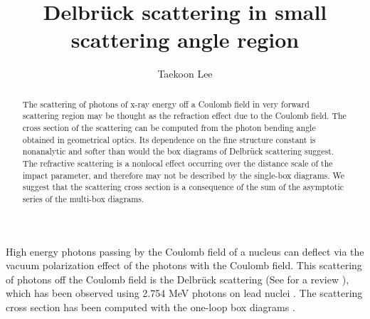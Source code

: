 \documentclass[aps,tightenlines,preprint]{revtex4-1}
\begin{document}
\title{Delbr{\"u}ck scattering in small scattering angle region}
\author{Taekoon Lee}



\begin{abstract}

The scattering of  photons of x-ray energy off a Coulomb field in very forward scattering
region may be thought as the refraction effect due to the Coulomb field. The cross section
of the scattering can be computed from the photon bending angle obtained in geometrical optics.
Its dependence on the fine structure constant is nonanalytic and 
softer than would the box diagrams of Delbr{\"u}ck scattering suggest.
The refractive scattering is a nonlocal effect occurring over the distance scale of the 
impact parameter, and therefore may not be described by the single-box diagrams. 
We suggest that the scattering cross section is a consequence of 
the sum of the asymptotic series of the multi-box diagrams. 


\end{abstract}  \pacs{}  %

\maketitle  


High energy photons passing by the Coulomb field of a nucleus can deflect via the
vacuum polarization effect of the photons with the Coulomb field. This scattering of photons off the
Coulomb field is the Delbr{\"u}ck scattering (See for a review \cite{schumacher}), which has been observed 
using 2.754 MeV photons on lead nuclei \cite{schumacher1}. 
The scattering cross section has been computed with the one-loop
box diagrams \cite{cheng1,cheng2,
   cheng3,tollis,zhu,mork,koga}.
\end{document}
